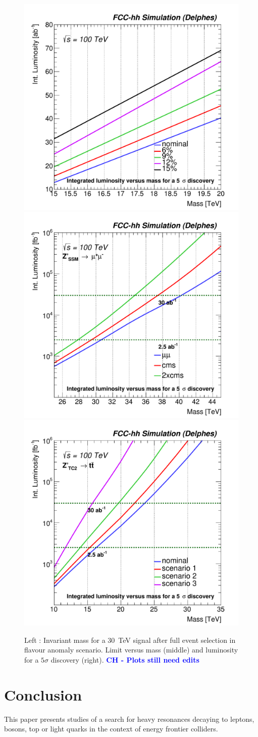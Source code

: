 \documentclass[a4paper,11pt]{article}
\newcommand{\CH}[1] {\textbf{\textcolor{blue}{CH - #1}}}
\begin{document}
\begin{figure}[!htb]
  \centering
    \includegraphics[width=0.32\columnwidth]{Fig/DiscoveryPotential_Zp_jj_comb_smeared_rootStyle.pdf}
  \includegraphics[width=0.32\columnwidth]{Fig/DiscoveryPotential_ll_smearhl_rootStyle.pdf}
  \includegraphics[width=0.32\columnwidth]{Fig/DiscoveryPotential_zprime_tt_smeared.pdf}
  \caption{Left : Invariant mass for a 30~TeV signal after full event selection in flavour anomaly scenario. Limit versus mass (middle) and luminosity for a $5\sigma$ discovery (right). \CH{Plots still need edits}}
  \label{figure:detperf}
\end{figure}



\section{Conclusion}
\label{sec:conc}

This paper presents studies of a search for heavy resonances decaying to leptons, bosons, top or light quarks in the context of energy frontier colliders. 

\appendix
\end{document}
